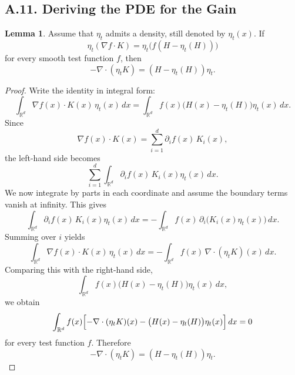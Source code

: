 \documentclass[11pt]{article}
\theoremstyle{definition}
\newtheorem{lemma}{Lemma}
\theoremstyle{remark}
\begin{document}
\subsection*{A.11. Deriving the PDE for the Gain}
\begin{lemma}
Assume that $\eta_t$ admits a density, still denoted by $\eta_t(x)$. If
\[
\eta_t(\nabla f\cdot K)=\eta_t\bigl(f(H-\eta_t(H))\bigr)
\]
for every smooth test function $f$, then
\[
-\nabla\cdot(\eta_t K)=(H-\eta_t(H))\eta_t.
\]
\end{lemma}

\begin{proof}
Write the identity in integral form:
\[
\int_{\mathbb R^d} \nabla f(x)\cdot K(x)\,\eta_t(x)\,dx
=
\int_{\mathbb R^d} f(x)\bigl(H(x)-\eta_t(H)\bigr)\eta_t(x)\,dx.
\]
Since
\[
\nabla f(x)\cdot K(x)=\sum_{i=1}^d \partial_i f(x)\,K_i(x),
\]
the left-hand side becomes
\[
\sum_{i=1}^d \int_{\mathbb R^d} \partial_i f(x)\,K_i(x)\eta_t(x)\,dx.
\]
We now integrate by parts in each coordinate and assume the boundary terms vanish at infinity. This gives
\[
\int_{\mathbb R^d} \partial_i f(x)\,K_i(x)\eta_t(x)\,dx
=
-\int_{\mathbb R^d} f(x)\,\partial_i\bigl(K_i(x)\eta_t(x)\bigr)\,dx.
\]
Summing over $i$ yields
\[
\int_{\mathbb R^d} \nabla f(x)\cdot K(x)\,\eta_t(x)\,dx
=
-\int_{\mathbb R^d} f(x)\,\nabla\cdot(\eta_t K)(x)\,dx.
\]
Comparing this with the right-hand side,
\[
\int_{\mathbb R^d} f(x)\bigl(H(x)-\eta_t(H)\bigr)\eta_t(x)\,dx,
\]
we obtain
\[
\int_{\mathbb R^d} f(x)\Bigl[-\nabla\cdot(\eta_t K)(x)-\bigl(H(x)-\eta_t(H)\bigr)\eta_t(x)\Bigr]\,dx=0
\]
for every test function $f$. Therefore
\[
-\nabla\cdot(\eta_t K)=(H-\eta_t(H))\eta_t.
\]
\end{proof}
\end{document}
